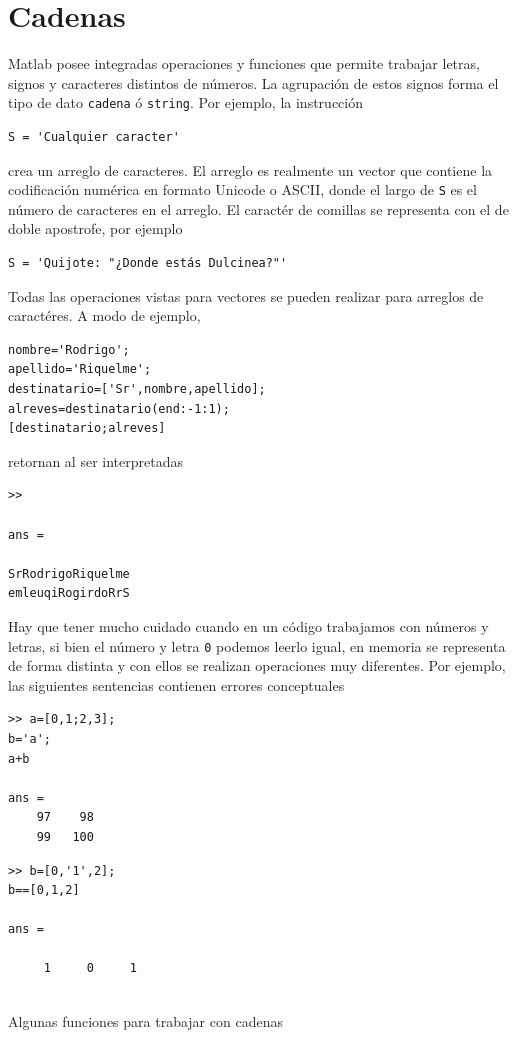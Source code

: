 \documentclass[11pt,legalpaper]{article}
\begin{document}
\section{Cadenas}
Matlab posee integradas operaciones y funciones que permite trabajar letras, signos y caracteres distintos de números. La agrupación de estos signos forma el tipo de dato \texttt{cadena} ó \texttt{string}. Por ejemplo, la instrucci\'on
\begin{verbatim}
S = 'Cualquier caracter'
\end{verbatim}
crea un arreglo de caracteres. El arreglo es realmente un vector que contiene la codificación numérica en formato Unicode o ASCII, donde el largo de \texttt{S} es el número de caracteres en el arreglo. El caractér de comillas se representa con el de doble apostrofe, por ejemplo
\begin{verbatim}
S = 'Quijote: "¿Donde estás Dulcinea?"'
\end{verbatim}
Todas las operaciones vistas para vectores se pueden realizar para arreglos de caractéres. A modo de ejemplo,
\begin{lstlisting}
nombre='Rodrigo';
apellido='Riquelme';
destinatario=['Sr',nombre,apellido];
alreves=destinatario(end:-1:1);
[destinatario;alreves]
\end{lstlisting}
retornan al ser interpretadas
\begin{verbatim}
>> 

ans =

SrRodrigoRiquelme
emleuqiRogirdoRrS
\end{verbatim}
Hay que tener mucho cuidado cuando en un código trabajamos con números y letras, si bien el número y letra \texttt{0} podemos leerlo igual, en memoria se representa de forma distinta y con ellos se realizan operaciones muy diferentes. Por ejemplo, las siguientes sentencias contienen errores conceptuales
\begin{multicols}{2}
\begin{lstlisting}
>> a=[0,1;2,3];
b='a';
a+b

ans =
    97    98
    99   100
\end{lstlisting}

\begin{lstlisting}
>> b=[0,'1',2];
b==[0,1,2]

ans =

     1     0     1
     
\end{lstlisting}
\end{multicols}
Algunas funciones para trabajar con cadenas 
\end{document}
